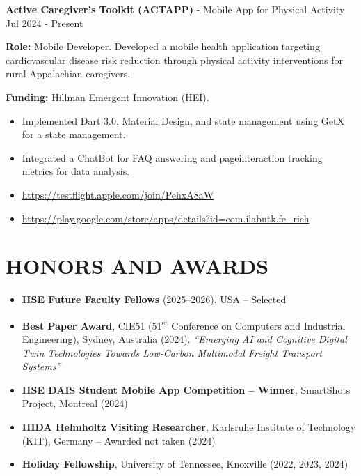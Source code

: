 \documentclass[10pt, letterpaper]{article}
\newenvironment{highlights}{
    \begin{itemize}[
        topsep=0.10 cm,
        parsep=0.10 cm,
        partopsep=0pt,
        itemsep=0pt,
        leftmargin=0 cm + 10pt
    ]
}{
    \end{itemize}
} %
\begin{document}
\vspace{0.3cm}
\noindent\textbf{Active Caregiver's Toolkit (ACTAPP)} - Mobile App for Physical Activity \hfill Jul 2024 - Present

\noindent\textbf{Role:} Mobile Developer. Developed a mobile health application targeting cardiovascular disease risk reduction through physical activity interventions for rural Appalachian caregivers.

\noindent\textbf{Funding:} Hillman Emergent Innovation (HEI).

\begin{highlights}
    \item Implemented Dart 3.0, Material Design, and state management using GetX for a state management.
    \item Integrated a ChatBot for FAQ answering and page\/interaction tracking metrics for data analysis.
    \item \url{https://testflight.apple.com/join/PehxA8aW}
    \item \url{https://play.google.com/store/apps/details?id=com.ilabutk.fe_rich}
\end{highlights}



\section{HONORS AND AWARDS}
\small

\begin{itemize}[topsep=0pt, parsep=0pt, partopsep=0pt, itemsep=3pt, leftmargin=10pt]
    \item \textbf{IISE Future Faculty Fellows} (2025--2026), USA -- Selected
    \item \textbf{Best Paper Award}, CIE51 (51\textsuperscript{st} Conference on Computers and Industrial Engineering), Sydney, Australia (2024). \textit{``Emerging AI and Cognitive Digital Twin Technologies Towards Low-Carbon Multimodal Freight Transport Systems''}
    \item \textbf{IISE DAIS Student Mobile App Competition -- Winner}, SmartShots Project, Montreal (2024)
    \item \textbf{HIDA Helmholtz Visiting Researcher}, Karlsruhe Institute of Technology (KIT), Germany -- Awarded not taken (2024)
    \item \textbf{Holiday Fellowship}, University of Tennessee, Knoxville (2022, 2023, 2024)
\end{itemize}
\end{document}
